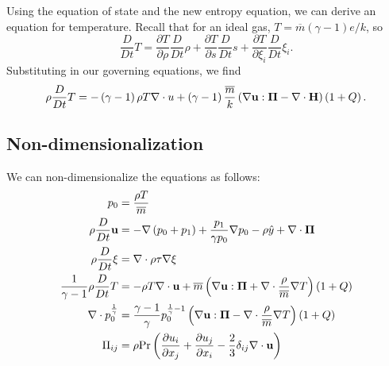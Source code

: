 Using the equation of state and the new entropy equation, we can derive an equation for temperature.
	Recall that for an ideal gas, $T=\overline{m}\left(\gamma - 1\right)e/k$, so
	\begin{equation}
		\frac{D}{Dt}T=\frac{\partial T}{\partial \rho}\frac{D}{Dt}\rho + \frac{\partial T}{\partial s}\frac{D}{Dt}s + \frac{\partial T}{\partial \xi_{i}}\frac{D}{Dt}\xi_{i}.
	\end{equation}
	Substituting in our governing equations, we find
	\begin{equation}
		\rho\frac{D}{Dt}T=-\left(\gamma - 1\right)\rho T\nabla\cdot{u} + \left(\gamma - 1\right)\frac{\overline{m}}{k}\left(\nabla\mathbf{u}:\mathbf{\Pi}-\nabla\cdot{\mathbf{H}}\right)\left(1 + Q\right).
	\end{equation}


\subsection{Non-dimensionalization} %
\label{sub:model:nondim}

	We can non-dimensionalize the equations as follows:
		\begin{align}
			p_{0} &= \frac{\rho T}{\overline{m}} \\
			\rho\frac{D}{Dt}\mathbf{u} &= -\nabla\left(p_{0} + p_{1}\right) + \frac{p_{1}}{\gamma p_{0}}\nabla{p_{0}} - \rho \hat{y} + \nabla \cdot \mathbf{\Pi} \\
			\rho\frac{D}{Dt}\xi &= \nabla \cdot \rho \tau \nabla \xi \\
			\frac{1}{\gamma - 1}\rho\frac{D}{Dt} T &= -\rho T \nabla \cdot \mathbf{u} + \overline{m}\left(\nabla\mathbf{u}:\mathbf{\Pi} + \nabla\cdot \frac{\rho}{\overline{m}}\nabla{T}\right)\left(1 + Q\right) \\
			\nabla\cdot{p_{0}^{\frac{1}{\gamma}}} &= \frac{\gamma - 1}{\gamma}p_{0}^{\frac{1}{\gamma}-1}\left(\nabla\mathbf{u}:\mathbf{\Pi}-\nabla\cdot \frac{\rho}{\overline{m}}\nabla{T}\right)\left(1 + Q\right) \\
			\Pi_{ij} &= \rho \mathrm{Pr}\left(\frac{\partial u_{i}}{\partial x_{j}} + \frac{\partial u_{j}}{\partial x_{i}} - \frac{2}{3}\delta_{ij}\nabla\cdot{\mathbf{u}}\right)
		\end{align}


